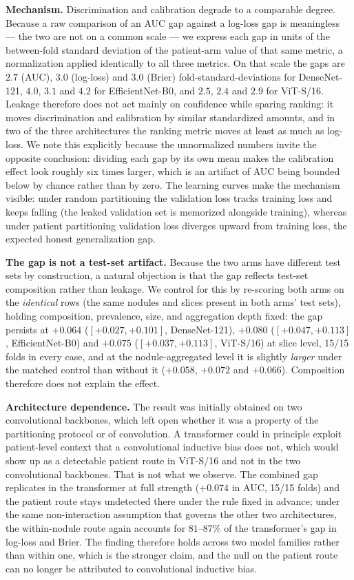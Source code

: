 \documentclass{ieeeaccess}
\begin{document}
\textbf{Mechanism.} Discrimination and calibration degrade to a comparable degree. Because a raw
comparison of an AUC gap against a log-loss gap is meaningless --- the two are not on a common scale
--- we express each gap in units of the between-fold standard deviation of the patient-arm value of
that same metric, a normalization applied identically to all three metrics. On that scale the gaps
are $2.7$ (AUC), $3.0$ (log-loss) and $3.0$ (Brier) fold-standard-deviations for DenseNet-121,
$4.0$, $3.1$ and $4.2$ for EfficientNet-B0, and $2.5$, $2.4$ and $2.9$ for ViT-S/16. Leakage
therefore does not act mainly on confidence while
sparing ranking: it moves discrimination and calibration by similar standardized amounts, and in two
of the three architectures the ranking metric moves at least as much as log-loss. We note this
explicitly because the unnormalized
numbers invite the opposite conclusion: dividing each gap by its own mean makes the calibration
effect look roughly six times larger, which is an artifact of AUC being bounded below by chance
rather than by zero. The learning curves make the
mechanism visible: under random partitioning the validation loss tracks training loss and keeps
falling (the leaked validation set is memorized alongside training), whereas under patient
partitioning validation loss diverges upward from training loss, the expected honest
generalization gap.

\textbf{The gap is not a test-set artifact.} Because the two arms have different test sets by
construction, a natural objection is that the gap reflects test-set composition rather than
leakage. We control for this by re-scoring both arms on the \emph{identical} rows (the same nodules
and slices present in both arms' test sets), holding composition, prevalence, size, and aggregation
depth fixed: the gap persists at $+0.064$ ($[+0.027, +0.101]$, DenseNet-121), $+0.080$
($[+0.047, +0.113]$, EfficientNet-B0) and $+0.075$ ($[+0.037, +0.113]$, ViT-S/16) at slice level,
15/15 folds in every case, and at the nodule-aggregated level
it is slightly \emph{larger} under the matched control than without it ($+0.058$, $+0.072$ and
$+0.066$). Composition therefore does not explain the effect.

\textbf{Architecture dependence.} The result was initially obtained on two convolutional backbones,
which left open whether it was a property of the partitioning protocol or of convolution. A
transformer could in principle exploit patient-level context that a convolutional inductive bias
does not, which would show up as a detectable patient route in ViT-S/16 and not in the two
convolutional backbones. That is
not what we observe. The combined gap replicates in the transformer at full strength ($+0.074$ in
AUC, 15/15 folds) and the patient route stays undetected there under the rule fixed in advance;
under the same non-interaction assumption that governs the other two architectures, the within-nodule
route again accounts for $81$--$87\%$ of the transformer's gap in log-loss and Brier. The finding
therefore holds
across two model families rather than within one, which is the stronger claim, and the null on the
patient route can no longer be attributed to convolutional inductive bias.
\end{document}
